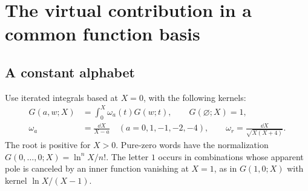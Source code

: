 \section{The virtual contribution in a common function basis}
\label{sec:comp-virtual-energy-basis}
\subsection{A constant alphabet}
Use iterated integrals based at $X=0$, with the following kernels:
\begin{align}
 G(a,w;X)&=\int_0^X\omega_a(t)G(w;t),\qquad G(\varnothing;X)=1,\\
 \omega_a&=\frac{\dd X}{X-a}\quad(a=0,1,-1,-2,-4),\qquad
 \omega_r=\frac{\dd X}{\sqrt{X(X+4)}}.
\end{align}
The root is positive for $X>0$. Pure-zero words have the normalization
$G(0,\ldots,0;X)=\ln^nX/n!$. The letter $1$ occurs in combinations
whose apparent pole is canceled by an inner function vanishing at
$X=1$, as in $G(1,0;X)$ with kernel $\ln X/(X-1)$.

